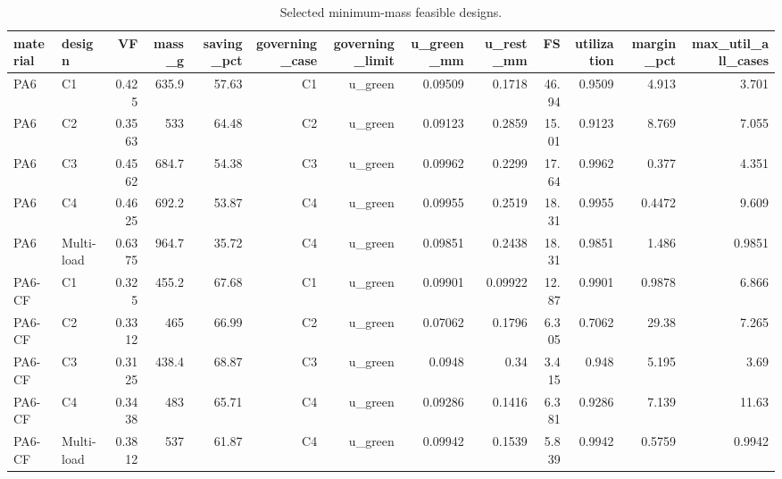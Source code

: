 \begin{table}[htbp]
\centering
\caption{Selected minimum-mass feasible designs.}
\label{tab:T10_04_selected_designs}
\begin{tabular}{llrrrrrrrrrrr}
\toprule
material & design & VF & mass\_g & saving\_pct & governing\_case & governing\_limit & u\_green\_mm & u\_rest\_mm & FS & utilization & margin\_pct & max\_util\_all\_cases \\
\midrule
PA6 & C1 & 0.425 & 635.9 & 57.63 & C1 & u\_green & 0.09509 & 0.1718 & 46.94 & 0.9509 & 4.913 & 3.701 \\
PA6 & C2 & 0.3563 & 533 & 64.48 & C2 & u\_green & 0.09123 & 0.2859 & 15.01 & 0.9123 & 8.769 & 7.055 \\
PA6 & C3 & 0.4562 & 684.7 & 54.38 & C3 & u\_green & 0.09962 & 0.2299 & 17.64 & 0.9962 & 0.377 & 4.351 \\
PA6 & C4 & 0.4625 & 692.2 & 53.87 & C4 & u\_green & 0.09955 & 0.2519 & 18.31 & 0.9955 & 0.4472 & 9.609 \\
PA6 & Multi-load & 0.6375 & 964.7 & 35.72 & C4 & u\_green & 0.09851 & 0.2438 & 18.31 & 0.9851 & 1.486 & 0.9851 \\
PA6-CF & C1 & 0.325 & 455.2 & 67.68 & C1 & u\_green & 0.09901 & 0.09922 & 12.87 & 0.9901 & 0.9878 & 6.866 \\
PA6-CF & C2 & 0.3312 & 465 & 66.99 & C2 & u\_green & 0.07062 & 0.1796 & 6.305 & 0.7062 & 29.38 & 7.265 \\
PA6-CF & C3 & 0.3125 & 438.4 & 68.87 & C3 & u\_green & 0.0948 & 0.34 & 3.415 & 0.948 & 5.195 & 3.69 \\
PA6-CF & C4 & 0.3438 & 483 & 65.71 & C4 & u\_green & 0.09286 & 0.1416 & 6.381 & 0.9286 & 7.139 & 11.63 \\
PA6-CF & Multi-load & 0.3812 & 537 & 61.87 & C4 & u\_green & 0.09942 & 0.1539 & 5.839 & 0.9942 & 0.5759 & 0.9942 \\
\bottomrule
\end{tabular}
\end{table}
